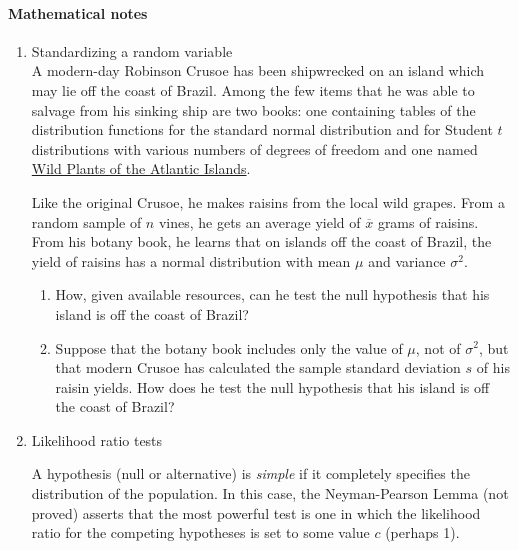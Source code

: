 \documentclass[12pt]{article}
\begin{document}
\pagebreak





\paragraph*{Mathematical notes}



\begin{enumerate}

\item Standardizing a random variable\\
A modern-day Robinson Crusoe has been shipwrecked on an island which may lie off the coast of Brazil. Among the few items that he was able to salvage from his sinking ship are two books: one containing tables of the distribution functions for the standard normal distribution and for Student $t$ distributions with various numbers of degrees of freedom and one named \underline{Wild Plants of the Atlantic Islands}.

Like the original Crusoe, he makes raisins from the local wild grapes. From a random sample of $n$ vines, he gets an average yield of $\overline{x}$ grams of raisins. From his botany book, he learns that on islands off the coast of Brazil, the yield of raisins has a normal distribution with mean $\mu$ and variance $\sigma^2$. 

\begin{enumerate}
\item How, given available resources, can he test the null hypothesis that his island is off the coast of Brazil?


\item Suppose that the botany book includes only the value of $\mu$, not of  $\sigma^2$, but that modern Crusoe has calculated the sample standard deviation $s$ of his raisin yields. How does he test the null hypothesis that his island is off the coast of Brazil?

\end{enumerate}



\pagebreak

\item Likelihood ratio tests

A hypothesis (null or alternative) is \emph{simple} if it completely specifies the distribution of the population. In this case, the Neyman-Pearson Lemma (not proved) asserts that the most powerful test is one in which the likelihood ratio for the competing hypotheses is set to some value $c$ (perhaps 1).


\end{enumerate}
\end{document}
